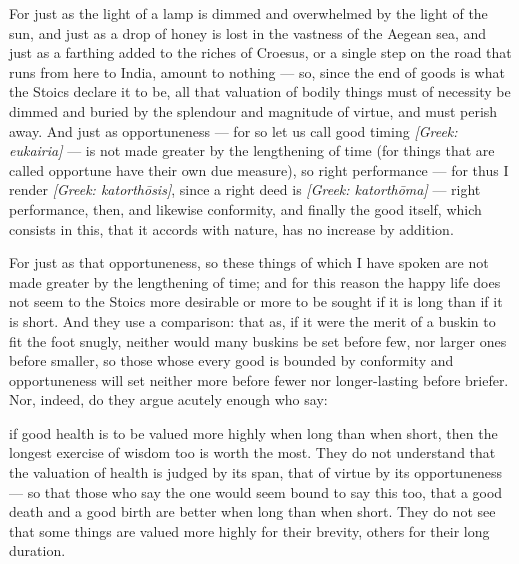  For just as the light of a lamp is dimmed and overwhelmed by the light of the sun, and just as a drop of honey is lost in the vastness of the Aegean sea, and just as a farthing added to the riches of Croesus, or a single step on the road that runs from here to India, amount to nothing — so, since the end of goods is what the Stoics declare it to be, all that valuation of bodily things must of necessity be dimmed and buried by the splendour and magnitude of virtue, and must perish away. And just as opportuneness — for so let us call good timing \textit{[Greek: eukairia]} — is not made greater by the lengthening of time (for things that are called opportune have their own due measure), so right performance — for thus I render \textit{[Greek: katorthōsis]}, since a right deed is \textit{[Greek: katorthōma]} — right performance, then, and likewise conformity, and finally the good itself, which consists in this, that it accords with nature, has no increase by addition.

 For just as that opportuneness, so these things of which I have spoken are not made greater by the lengthening of time; and for this reason the happy life does not seem to the Stoics more desirable or more to be sought if it is long than if it is short. And they use a comparison: that as, if it were the merit of a buskin to fit the foot snugly, neither would many buskins be set before few, nor larger ones before smaller, so those whose every good is bounded by conformity and opportuneness will set neither more before fewer nor longer-lasting before briefer. Nor, indeed, do they argue acutely enough who say:

 if good health is to be valued more highly when long than when short, then the longest exercise of wisdom too is worth the most. They do not understand that the valuation of health is judged by its span, that of virtue by its opportuneness — so that those who say the one would seem bound to say this too, that a good death and a good birth are better when long than when short. They do not see that some things are valued more highly for their brevity, others for their long duration.

